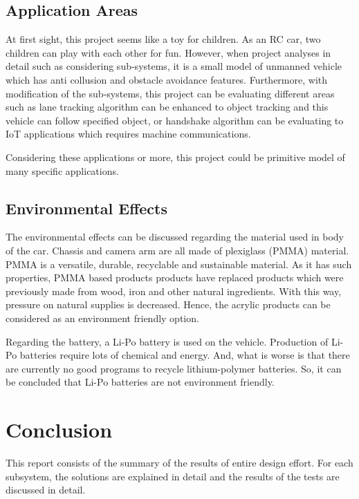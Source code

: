 \documentclass[a4paper,12pt]{article}
\begin{document}
	\subsection{Application Areas}
		At first sight, this project seems like a toy for children. As an RC car, two children can play with each other for fun. However, when project analyses in detail such as considering sub-systems, it is a small model of unmanned vehicle which has anti collusion and obstacle avoidance features. Furthermore, with modification of the sub-systems, this project can be evaluating different areas such as lane tracking algorithm can be enhanced to object tracking and this vehicle can follow specified object, or handshake algorithm can be evaluating to IoT applications which requires machine communications.
		
		Considering these applications or more, this project could be primitive model of many specific applications.

	\subsection{Environmental Effects}
		
		The environmental effects can be discussed regarding the material used in body of the car. Chassis and camera arm are all made of plexiglass (PMMA) material. PMMA is a versatile, durable, recyclable and sustainable material. As it has such properties, PMMA based products products have replaced products which were previously made from wood, iron and other natural ingredients. With this way, pressure on natural supplies is decreased. Hence, the acrylic products can be considered as an environment friendly option.

		Regarding the battery, a Li-Po battery is used on the vehicle. Production of Li-Po batteries require lots of chemical and energy. And, what is worse is that there are currently no good programs to recycle lithium-polymer batteries. So, it can be concluded that Li-Po batteries are not environment friendly.

	\section{Conclusion}
	
		This report consists of the summary of the results of entire design effort. For each subsystem, the solutions are explained in detail and the results of the tests are discussed in detail. \\
		
\end{document}
